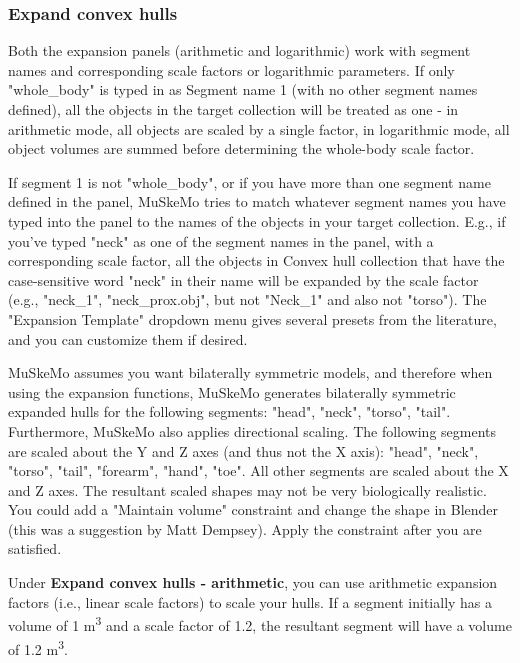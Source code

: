 \documentclass{article}
\begin{document}
\subsubsection{Expand convex hulls} 

Both the expansion panels (arithmetic and logarithmic) work with segment names and corresponding scale factors or logarithmic parameters. If only "whole\_body" is typed in as Segment name 1 (with no other segment names defined), all the objects in the target collection will be treated as one - in arithmetic mode, all objects are scaled by a single factor, in logarithmic mode, all object volumes are summed before determining the whole-body scale factor. 

If segment 1 is not "whole\_body", or if you have more than one segment name defined in the panel, MuSkeMo tries to match whatever segment names you have typed into the panel to the names of the objects in your target collection. E.g., if you've typed "neck" as one of the segment names in the panel, with a corresponding scale factor, all the objects in Convex hull collection that have the case-sensitive word "neck" in their name will be expanded by the scale factor (e.g., "neck\_1", "neck\_prox.obj", but not "Neck\_1" and also not "torso"). The "Expansion Template" dropdown menu gives several presets from the literature, and you can customize them if desired.

MuSkeMo assumes you want bilaterally symmetric models, and therefore when using the expansion functions, MuSkeMo generates bilaterally symmetric expanded hulls for the following segments: "head", "neck", "torso", "tail". Furthermore, MuSkeMo also applies directional scaling. The following segments are scaled about the Y and Z axes (and thus not the X axis): "head", "neck", "torso", "tail", "forearm", "hand", "toe". All other segments are scaled about the X and Z axes. The resultant scaled shapes may not be very biologically realistic. You could add a "Maintain volume" constraint and change the shape in Blender (this was a suggestion by Matt Dempsey). Apply the constraint after you are satisfied.

Under \textbf{Expand convex hulls - arithmetic}, you can use arithmetic expansion factors (i.e., linear scale factors) to scale your hulls. If a segment initially has a volume of 1 \si{m^3} and a scale factor of 1.2, the resultant segment will have a volume of 1.2 \si{m^3}. 
\end{document}
